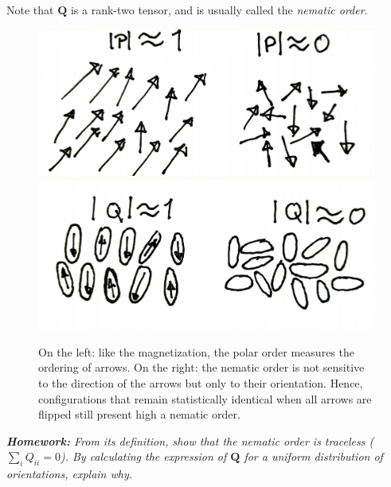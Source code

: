 Note that $\bm Q$ is a rank-two tensor, and is usually called the \textit{nematic order}. 
%
%

\begin{figure}[!b]
    \centering
    \includegraphics[width=.38\textwidth]{chapters/Figures/scalar/polar.pdf}
    \hspace{1cm}
    \includegraphics[width=.4\textwidth]{chapters/Figures/scalar/nematic.pdf}
    \caption{
    On the left: like the magnetization, the polar order measures the ordering of arrows.
    On the right: the nematic order is not sensitive to the direction of the arrows but only to their orientation. Hence, configurations that remain statistically identical when all arrows are flipped still present high a nematic order.}
    \label{fig: polar and nematic}
\end{figure}

\textit{{\bf Homework:} From its definition, show that the nematic order is traceless (${\sum}_i Q_{ii} = 0$).
By calculating the expression of $\bm Q$ for a uniform distribution of orientations, explain why.}

